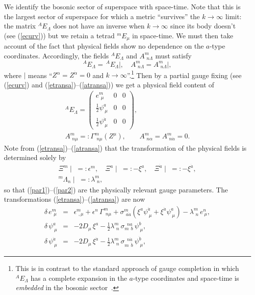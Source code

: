 \documentclass[a4paper,12pt]{article}
\newcommand{\al}{\ensuremath{\alpha}}
\newcommand{\La}{\ensuremath{\Lambda}}
\newcommand{\la}{\ensuremath{\lambda}}
\newcommand{\Ga}{\ensuremath{\Gamma}}
\newcommand{\de}{\ensuremath{\delta}}
\newcommand{\si}{\ensuremath{\sigma}}
\newcommand{\ep}{\ensuremath{\epsilon}}
\newcommand{\sfrac}[2]{\ensuremath{{\scriptstyle \frac{#1}{#2}}}}
\begin{document}
We identify the bosonic sector of superspace with space-time. Note that this is the largest sector of superspace for which a metric ``survives'' the $k\to\infty$ limit: the matrix $^A\!E_\La$ does not have an inverse when $k\to\infty$ since its body doesn't~\cite{dew} (see (\ref{ecurv})) but we retain a tetrad $^m\!E_\mu$ in space-time. We must then take account of the fact that physical fields show no dependence on the $a$-type coordinates. Accordingly, the fields $^A\!E_\La$ and $A^m_{\ \,n\La}$ must satisfy
\[
^A\!E_\La=\,^A\!E_\La\!\!\mid , \quad A^m_{\ \,n\La}= A^m_{\ \,n\La}\!\!\mid,
\]
where $\mid$ means ``$Z^\al=Z^{\dot{\al}}=0$ and $k\to\infty$''.\footnote{This is in contrast to the standard approach of gauge completion in which $^A\!E_\La$ has a complete expansion in the $a$-type coordinates and space-time is {\it embedded} in the bosonic sector~\cite{nat2,bri,wes}.} 
Then by a partial gauge fixing (see (\ref{ecurv}) and (\ref{etransa})--(\ref{atransa})) we get a physical field content of
\begin{gather}
^A\!E_\La=\left(\begin{array}{ccc} e^m_{\ \,\mu} & 0 & 0 \\
\frac{1}{2}\psi^a_{\ \mu} & 0 & 0 \\
\frac{1}{2}\psi^{\dot{a}}_{\ \mu} & 0 & 0 \end{array}\right), \label{physe} \\
A^m_{\ \,n\mu}=:\Ga^m_{\ \,n\mu}(Z^\mu),    \qquad A^m_{\ \,n\al}=A^m_{\ \,n\dot{\al}}=0. \label{physA=0}
\end{gather}
Note from (\ref{etransa})--(\ref{atransa}) that the transformation of the physical fields is determined solely by
\begin{gather}
\Xi^m\!\!\mid\;=:\ep^m, \quad\Xi^a\!\!\mid\;=:-\xi^a, \quad \Xi^{\dot{a}}\!\!\mid\;=:-\xi^{\dot{a}},  \label{par1} \\
^m\!\La_n\!\!\mid\;=:\la^m_{\ \,n}, \label{par2}
\end{gather}
so that (\ref{par1})--(\ref{par2}) are the physically relevant gauge parameters. The transformations (\ref{etransa})--(\ref{atransa}) are now
\begin{eqnarray}
\de\,e^m_{\ \,\mu}&=&\ep^m_{\ \, ,\mu}+\ep^n\,\Ga^m_{\ \,n\mu}+\si^m_{\ \,a\dot{a}}(\xi^a\psi^{\dot{a}}_{\ \mu}+\xi^{\dot{a}}\psi^a_{\ \mu})-\la^m_{\ \,n}\,e^n_{\ \mu}, \label{sg1} \\
\de\,\psi^a_{\ \mu}&=&-2D_\mu\,\xi^a-\sfrac{1}{2}\la^m_{\ \,n}\,\si_{m\ \ b}^{\ \;na}\,\psi^b_{\ \mu}, \label{sg2} \\
\de\,\psi^{\dot{a}}_{\ \mu}&=&-2D_\mu\,\xi^{\dot{a}}-\sfrac{1}{2}\la^m_{\ \,n}\,\si_{m\ \ \dot{b}}^{\ \;n\dot{a}}\,\psi^{\dot{b}}_{\ \mu}, \label{sg3} 
\end{eqnarray}
\end{document}
